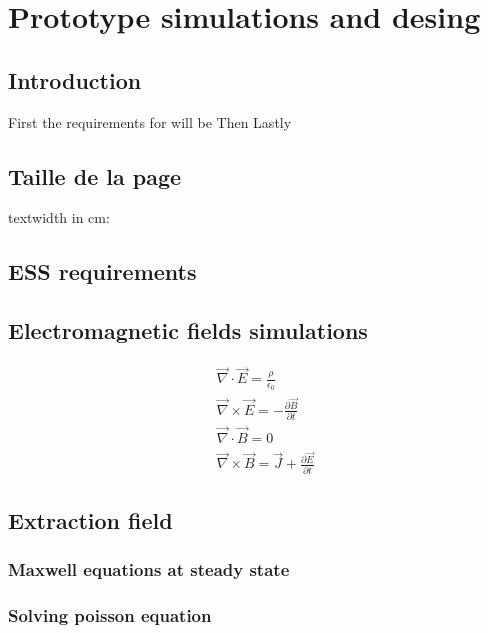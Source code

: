 \chapter{Prototype simulations and desing}
\cleardoublepage
\minitoc
\section{Introduction}
\begin{refsection}
	\label{ch3:Introduction}
	First the requirements for will be
	Then
	Lastly
	\section{Taille de la page}
	textwidth in cm: \prntlen{\textwidth}
	\section{ESS requirements}
	
	\section{Electromagnetic fields simulations}

	\begin{align}
		 & \overrightarrow{\nabla} \cdot \overrightarrow{E} = \frac{\rho}{\epsilon_{0}}                                            \\
		 & \overrightarrow{\nabla} \times \overrightarrow{E} = - \frac{\partial \overrightarrow{B}}{\partial t}                    \\
		 & \overrightarrow{\nabla} \cdot \overrightarrow{B} = 0                                                                    \\
		 & \overrightarrow{\nabla} \times \overrightarrow{B} = \overrightarrow{J} + \frac{\partial \overrightarrow{E}}{\partial t}
	\end{align}

	\section{Extraction field}
	\subsection{Maxwell equations at steady state}
	\subsection{Solving poisson equation}


\end{refsection}
